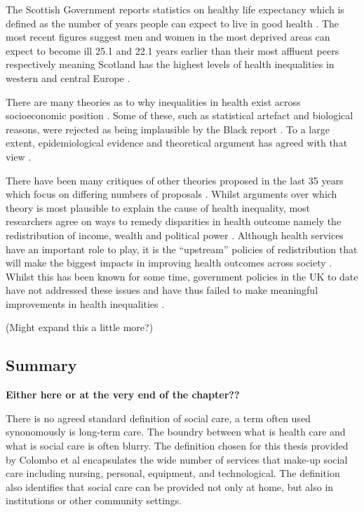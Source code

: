 \documentclass[12pt,]{report}
\begin{document}
The Scottish Government reports statistics on healthy life expectancy
which is defined as the number of years people can expect to live in
good health \citep{RN315}. The most recent figures suggest men and women
in the most deprived areas can expect to become ill 25.1 and 22.1 years
earlier than their most affluent peers respectively \citep{RN315}
meaning Scotland has the highest levels of health inequalities in
western and central Europe \citep{RN385, RN386}.

There are many theories as to why inequalities in health exist across
socioeconomic position \citep{RN327, RN333}. Some of these, such as
statistical artefact and biological reasons, were rejected as being
implausible by the Black report \citep{RN277}. To a large extent,
epidemiological evidence and theoretical argument has agreed with that
view \citep{RN327, RN83, RN82, RN333}.

There have been many critiques of other theories proposed in the last 35
years which focus on differing numbers of proposals
\citep{RN327, RN333, RN377, RN378, RN83}. Whilst arguments over which
theory is most plausible to explain the cause of health inequality, most
researchers agree on ways to remedy disparities in health outcome namely
the redistribution of income, wealth and political power
\citep{RN378, RN391, RN327, RN333}. Although health services have an
important role to play, it is the ``upstream'' policies of
redistribution that will make the biggest impacts in improving health
outcomes across society \citep{RN378, RN391, RN327, RN325}. Whilst this
has been known for some time, government policies in the UK to date have
not addressed these issues and have thus failed to make meaningful
improvements in health inequalities \citep{RN330, RN331, RN377}.

(Might expand this a little more?)

\subsection{Summary}\label{subsec:access-sc-summary}

\textbf{Either here or at the very end of the chapter??}

There is no agreed standard definition of social care, a term often used
synonomously is long-term care. The boundry between what is health care
and what is social care is often blurry. The definition chosen for this
thesis provided by Colombo et al \citep{RN414} encapsulates the wide
number of services that make-up social care including nursing, personal,
equipment, and technological. The definition also identifies that social
care can be provided not only at home, but also in institutions or other
community settings.
\end{document}
